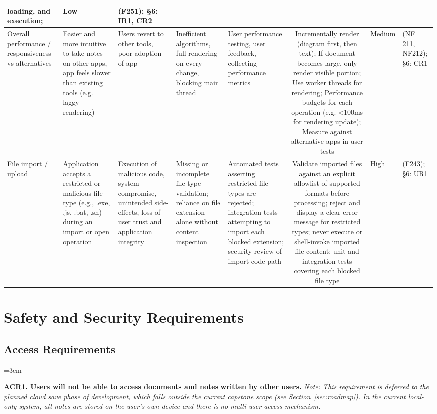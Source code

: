 \documentclass{article}
\begin{document}
\begin{tabularx}{\textwidth}{A B B B B C E A}
loading, and execution; & Low & (F251); \S6: IR1, CR2 \\ \midrule
Overall performance / responsiveness vs alternatives & Easier and more
intuitive to take notes on other apps, app feels slower than existing tools
(e.g. laggy rendering) & Users revert to other tools, poor adoption of app &
Inefficient algorithms, full rendering on every change, blocking main thread &
User performance testing, user feedback, collecting performance metrics &
Incrementally render (diagram first, then text); If document becomes large,
only render visible portion; Use worker threads for rendering; Performance
budgets for each operation (e.g. <100ms for rendering update); Measure
against alternative apps in user tests & Medium & (NF 211, NF212); \S6: CR1 \\ \midrule
File import / upload & Application accepts a restricted or malicious file type
(e.g., .exe, .js, .bat, .sh) during an import or open operation &
Execution of malicious code, system compromise, unintended side-effects,
loss of user trust and application integrity &
Missing or incomplete file-type validation; reliance on file extension alone
without content inspection &
Automated tests asserting restricted file types are rejected; integration
tests attempting to import each blocked extension; security review of import
code path &
Validate imported files against an explicit allowlist of supported formats
before processing; reject and display a clear error message for restricted
types; never execute or shell-invoke imported file content;
unit and integration tests covering each blocked file type &
High & (F243); \S6: UR1 \\
\bottomrule
\end{tabularx}

\newpage
{}
\recalctypearea

\section{Safety and Security Requirements}

\subsection{Access Requirements}
\begin{list}{}{\leftmargin=3em}
    \item \textbf{ACR1. Users will not be able to access documents and notes written by other users.}
    \textit{Note: This requirement is deferred to the planned cloud save phase of development, which falls outside the current capstone scope (see Section~\ref{sec:roadmap}). In the current local-only system, all notes are stored on the user's own device and there is no multi-user access mechanism.}
\end{list}
\end{document}
